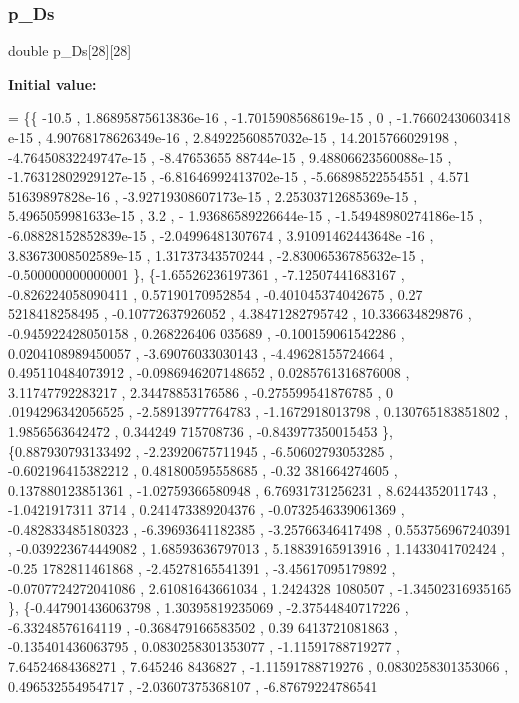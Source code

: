 \subsubsection{\texorpdfstring{p\+\_\+\+Ds}{p\_Ds}}
{\footnotesize\ttfamily double p\+\_\+\+Ds\mbox{[}28\mbox{]}\mbox{[}28\mbox{]}}

{\bfseries Initial value\+:}
\begin{DoxyCode}
= \{\{            -10.5 , 1.86895875613836e-16 , -1.7015908568619e-15 ,                 0 , -1.76602430603418
      e-15 , 4.90768178626349e-16 , 2.84922560857032e-15 ,  14.2015766029198 , -4.76450832249747e-15 , -8.47653655
      88744e-15 , 9.48806623560088e-15 , -1.76312802929127e-15 , -6.81646992413702e-15 , -5.66898522554551 , 4.571
      51639897828e-16 , -3.92719308607173e-15 , 2.25303712685369e-15 , 5.4965059981633e-15 ,               3.2 , -
      1.93686589226644e-15 , -1.54948980274186e-15 , -6.08828152852839e-15 , -2.04996481307674 , 3.91091462443648e
      -16 , 3.83673008502589e-15 ,  1.31737343570244 , -2.83006536785632e-15 , -0.500000000000001 \},
\{-1.65526236197361 , -7.12507441683167 , -0.826224058090411 ,  0.57190170952854 , -0.401045374042675 , 0.27
      5218418258495 , -0.10772637926052 ,  4.38471282795742 ,   10.336634829876 , -0.945922428050158 , 0.268226406
      035689 , -0.100159061542286 , 0.0204108989450057 , -3.69076033030143 , -4.49628155724664 , 0.495110484073912
       , -0.0986946207148652 , 0.0285761316876008 ,  3.11747792283217 ,  2.34478853176586 , -0.275599541876785 , 0
      .0194296342056525 , -2.58913977764783 ,  -1.1672918013798 , 0.130765183851802 ,   1.9856563642472 , 0.344249
      715708736 , -0.843977350015453 \},
\{0.887930793133492 , -2.23920675711945 , -6.50602793053285 , -0.602196415382212 , 0.481800595558685 , -0.32
      381664274605 , 0.137880123851361 , -1.02759366580948 ,  6.76931731256231 ,   8.6244352011743 , -1.0421917311
      3714 , 0.241473389204376 , -0.0732546339061369 , -0.482833485180323 , -6.39693641182385 , -3.25766346417498 
      , 0.553756967240391 , -0.039223674449082 ,  1.68593636797013 ,  5.18839165913916 ,   1.1433041702424 , -0.25
      1782811461868 , -2.45278165541391 , -3.45617095179892 , -0.0707724272041086 ,  2.61081643661034 ,  1.2424328
      1080507 , -1.34502316935165 \},
\{-0.447901436063798 ,  1.30395819235069 , -2.37544840717226 , -6.33248576164119 , -0.368479166583502 , 0.39
      6413721081863 , -0.135401436063795 , 0.0830258301353077 , -1.11591788719277 ,  7.64524684368271 ,   7.645246
      8436827 , -1.11591788719276 , 0.0830258301353066 , 0.496532554954717 , -2.03607375368107 , -6.87679224786541

\end{DoxyCode}
